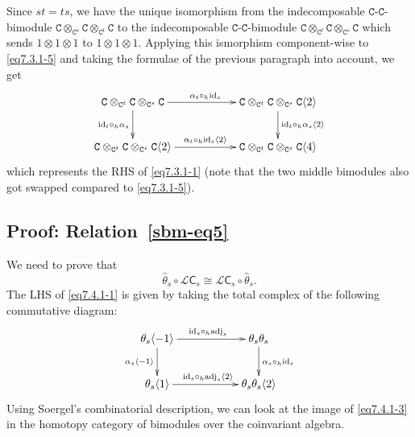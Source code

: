 \documentclass[a4paper]{amsart}
\begin{document}
Since $st=ts$, we have the unique isomorphism from 
the indecomposable $\mathtt{C}$-$\mathtt{C}$-bimodule
$\mathtt{C}\otimes_{\mathtt{C}^s}\mathtt{C}
\otimes_{\mathtt{C}^t}\mathtt{C}$ to
the indecomposable $\mathtt{C}$-$\mathtt{C}$-bimodule
$\mathtt{C}\otimes_{\mathtt{C}^t}\mathtt{C}
\otimes_{\mathtt{C}^s}\mathtt{C}$ which sends 
$1\otimes 1\otimes 1$ to $1\otimes 1\otimes 1$.
Applying this ismorphism component-wise to \eqref{eq7.3.1-5}
and taking the formulae of the previous paragraph into account,
we get 
\begin{equation}\label{eq7.3.1-55}
\xymatrix{
\mathtt{C}\otimes_{\mathtt{C}^t}\mathtt{C}
\otimes_{\mathtt{C}^s}\mathtt{C}
\ar[rr]^{\alpha_t\circ_h\mathrm{id}_s} 
\ar[d]_{\mathrm{id}_t\circ_h\alpha_s}&& 
\mathtt{C}\otimes_{\mathtt{C}^t}\mathtt{C}
\otimes_{\mathtt{C}^s}\mathtt{C}
\langle 2\rangle\ar[d]^{\mathrm{id}_t\circ_h\alpha_s\langle 2\rangle}\\
\mathtt{C}\otimes_{\mathtt{C}^t}\mathtt{C}
\otimes_{\mathtt{C}^s}\mathtt{C}\langle 2\rangle
\ar[rr]^{\alpha_t\circ_h\mathrm{id}_s\langle 2\rangle} 
&&\mathtt{C}\otimes_{\mathtt{C}^t}\mathtt{C}
\otimes_{\mathtt{C}^s}\mathtt{C}\langle 4\rangle\\
}  
\end{equation}
which represents the RHS of \eqref{eq7.3.1-1}
(note that the two middle bimodules also got swapped compared to 
\eqref{eq7.3.1-5}).
  

\subsection{Proof: Relation~\ref{sbm-eq5}}\label{s7.4}

We need to prove that 
\begin{equation}\label{eq7.4.1-1}
\hat{\theta}_s\circ \mathcal{L}\mathsf{C}_s
\cong \mathcal{L}\mathsf{C}_s\circ \hat{\theta}_s. 
\end{equation}
The LHS of \eqref{eq7.4.1-1}
is given by taking the total complex of the following commutative diagram:
\begin{equation}\label{eq7.4.1-3}
\xymatrix{
\theta_s\langle -1\rangle\ar[rr]^{\mathrm{id}_s\circ_h\mathrm{adj}_s} 
\ar[d]_{\alpha_s\langle -1\rangle}&& 
\theta_s\theta_s\ar[d]^{\alpha_s\circ_h\mathrm{id}_s}\\
\theta_s\langle 1\rangle
\ar[rr]^{\mathrm{id}_s\circ_h\mathrm{adj}_s\langle 2\rangle} 
&& \theta_s\theta_s\langle 2\rangle\\
} 
\end{equation}
Using Soergel's combinatorial description, we can look at the image of
\eqref{eq7.4.1-3} in the homotopy category of bimodules over the coinvariant
algebra.
\end{document}
